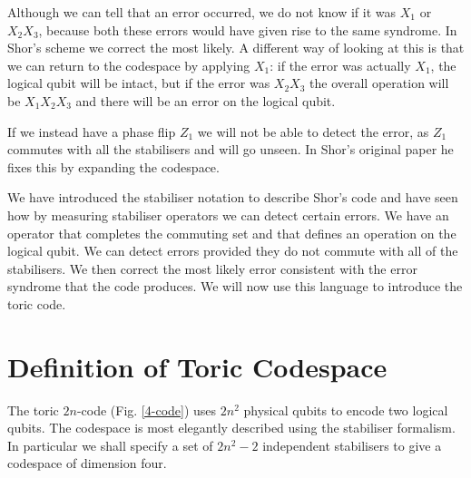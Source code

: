 Although we can tell that an error occurred, we do not know if it was $X_1$ or $X_2X_3$, because both these errors would have given rise to the same syndrome. In Shor's scheme we correct the most likely. A different way of looking at this is that we can return to the codespace by applying $X_1$: if the error was actually $X_1$, the logical qubit will be intact, but if the error was $X_2X_3$ the overall operation will be $X_1X_2X_3$ and there will be an error on the logical qubit.

If we instead have a phase flip $Z_1$ we will not be able to detect the error, as $Z_1$ commutes with all the stabilisers and will go unseen. In Shor's original paper he fixes this by expanding the codespace.

We have introduced the stabiliser notation to describe Shor's code and have seen how by measuring stabiliser operators we can detect certain errors. We have an operator that completes the commuting set and that defines an operation on the logical qubit. We can detect errors provided they do not commute with all of the stabilisers. We then correct the most likely error consistent with the error syndrome that the code produces. We will now use this language to introduce the toric code.

\section{Definition of Toric Codespace}

The toric $2n$-code (Fig. \ref{4-code}) uses $2n^2$ physical qubits to encode two logical qubits. The codespace is most elegantly described using the stabiliser formalism. In particular we shall specify a set of $2n^2 - 2$ independent stabilisers to give a codespace of dimension four.

